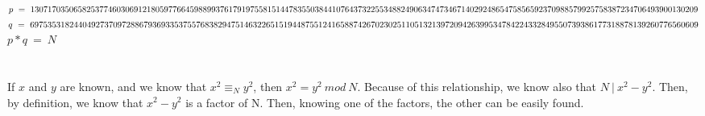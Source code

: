 \documentclass[10pt]{article}
\begin{document}
\noindent $p\ =\ 13071703506582537746030691218059776645988993761791975581514478\\
3550384410764373225534882490634747346714029248654758565923709885799257583872347\\
06493900130209$\\

\noindent $q\ =\ 69753531824404927370972886793693353755768382947514632265151944\\
8755124165887426702302511051321397209426399534784224332849550739386177318878139\\
260776560609$\\

$p*q\ =\ N$

\section{}
If $x$ and $y$ are known, and we know that $x^2 \equiv_N y^2$, then 
$x^2 = y^2\ mod\ N$. Because of this relationship, we know also that
$N\ |\ x^2-y^2$. Then, by definition, we know that $x^2-y^2$ is a factor of
N. Then, knowing one of the factors, the other can be easily found. 
\end{document}
